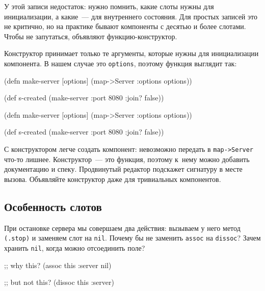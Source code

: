 \fi


У этой записи недостаток: нужно помнить, какие слоты нужны для инициализации, а
какие~--- для внутреннего состояния. Для простых записей это не критично, но на
практике бывают компоненты с десятью и более слотами. Чтобы не запутаться,
объявляют функцию-конструктор.

Конструктор принимает только те аргументы, которые нужны для инициализации
компонента. В нашем случае это \verb|options|, поэтому функция выглядит так:

\ifx\DEVICETYPE\MOBILE

\begin{english}
  \begin{clojure}
(defn make-server
  [options]
  (map->Server {:options options}))

(def s-created
  (make-server {:port 8080
                :join? false}))
  \end{clojure}
\end{english}

\else

\begin{english}
  \begin{clojure}
(defn make-server
  [options]
  (map->Server {:options options}))

(def s-created (make-server {:port 8080 :join? false}))
  \end{clojure}
\end{english}

\fi

С конструктором легче создать компонент: невозможно передать в
\verb|map->Server| что-то лишнее. Конструктор~--- это функция, поэтому к~нему
можно добавить документацию и спеку. Продвинутый редактор подскажет сигнатуру в
месте вызова. Объявляйте конструктор даже для тривиальных компонентов.

\subsection{Особенность слотов}

При остановке сервера мы совершаем два действия: вызываем у него метод
\verb|(.stop)| и заменяем слот на \verb|nil|. Почему бы не заменить
\verb|assoc| на \verb|dissoc|? Зачем хранить \verb|nil|, когда можно
отсоединить поле?

\ifx\DEVICETYPE\MOBILE

\begin{english}
  \begin{clojure}
;; why this?
(assoc this :server nil)
  \end{clojure}

\splitter

  \begin{clojure}
;; but not this?
(dissoc this :server)
  \end{clojure}
\end{english}

